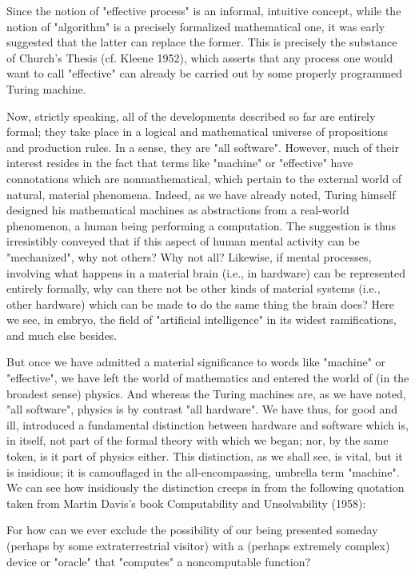 \documentclass[a4paper,12pt]{article}
\begin{document}
Since the notion of "effective process" is an informal, intuitive concept, while the notion of "algorithm" is a precisely formalized mathematical one,
it was early suggested that the latter can replace the former. This is precisely the substance of Church's Thesis (cf. Kleene 1952),
which asserts that any process one would want to call "effective" can already be carried out by some properly programmed Turing machine.

Now, strictly speaking, all of the developments described so far are entirely formal; they take place in a logical and mathematical universe of
propositions and production rules. In a sense, they are "all software". However, much of their interest resides in the fact that terms like "machine"
or "effective" have connotations which are nonmathematical, which pertain to the external world of natural, material phenomena.
Indeed, as we have already noted, Turing himself designed his mathematical machines as abstractions from a real-world phenomenon,
a human being performing a computation. The suggestion is thus irresistibly conveyed that if this aspect of human mental
activity can be "mechanized", why not others? Why not all? Likewise, if mental processes, involving what happens in a material
brain (i.e., in hardware) can be represented entirely formally, why can there not be other kinds of material systems (i.e., other hardware) which can be
made to do the same thing the brain does? Here we see, in embryo, the field of "artificial intelligence" in its widest ramifications, and much else besides.

But once we have admitted a material significance to words like "machine" or "effective", we have left the world of mathematics and entered
the world of (in the broadest sense) physics. And whereas the Turing machines are, as we have noted, "all software", physics is by contrast "all hardware".
We have thus, for good and ill, introduced a fundamental distinction between hardware and software which is, in itself,
not part of the formal theory with which we began; nor, by the same token, is it part of physics either. This distinction,
as we shall see, is vital, but it is insidious; it is camouflaged in the all-encompassing, umbrella term "machine".  We can
see how insidiously the distinction creeps in from the following quotation taken from Martin Davis's book Computability and Unsolvability (1958):

For how can we ever exclude the possibility of our being presented someday (perhaps by some extraterrestrial visitor) with
a (perhaps extremely complex) device or "oracle" that "computes" a noncomputable function?
\end{document}
